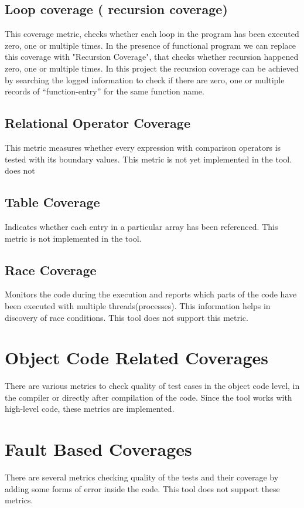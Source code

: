 \documentclass[12pt,a4paper]{report}
\begin{document}
\subsection{Loop coverage ( recursion coverage)}
This coverage metric, checks whether each loop in the program has been executed zero, one or multiple times. In the presence of functional program we can
 replace this coverage with "Recursion Coverage", that checks whether recursion happened zero, one or multiple times. In this project the recursion
 coverage can be achieved by searching the logged information to check if there are zero, one or multiple records of “function-entry” for the same function
 name. %

\subsection{Relational Operator Coverage}
This metric measures whether every expression with comparison operators is tested with its boundary values.
This metric is not yet implemented in the tool.
does not
\subsection{Table Coverage}
Indicates whether each entry in a particular array has been referenced.\cite{andersson2005automatic}
This metric is not implemented in the tool.

\subsection{Race Coverage}
Monitors the code during the execution and reports which parts of the code have been executed with multiple threads(processes). This information helps in
 discovery of race conditions. This tool does not support this metric.

\section{Object Code Related Coverages}
There are various metrics to check quality of test cases in the object code level, in the compiler or directly after compilation of the code. Since the tool
 works with high-level code, these metrics are implemented.

\section{Fault Based Coverages}
There are several metrics checking quality of the tests and their coverage by adding some forms of error inside the code. This tool does not support these
 metrics.
\end{document}
